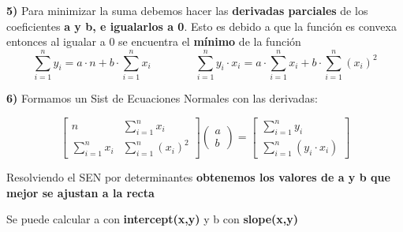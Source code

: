 \documentclass[12pt,a4paper]{article}
\begin{document}
\textbf{5)} Para minimizar la suma debemos hacer las \textbf{derivadas parciales} de los coeficientes \textbf{a y b, e igualarlos a 0}. Esto es debido a que la función es convexa entonces al igualar a 0 se encuentra el \textbf{mínimo} de la función
\[
\sum_{i=1}^{n} y_i = a\cdot n + b\cdot\sum_{i=1}^{n} x_i
\qquad\qquad
\sum_{i=1}^{n} y_i\cdot x_i = a\cdot\sum_{i=1}^{n} x_i + b\cdot\sum_{i=1}^{n} (x_i)^2
\]

\textbf{6)} Formamos un Sist de Ecuaciones Normales con las derivadas:

\begin{minipage}[t]{0.55\linewidth}
\vspace{0pt}
\[
\begin{bmatrix}
n & \displaystyle\sum_{i=1}^{n} x_i \\[10pt]
\displaystyle\sum_{i=1}^{n} x_i & \displaystyle\sum_{i=1}^{n} (x_i)^2
\end{bmatrix}
\begin{pmatrix} a \\ b \end{pmatrix}
=
\begin{bmatrix}
\displaystyle\sum_{i=1}^{n} y_i \\[10pt]
\displaystyle\sum_{i=1}^{n} \left(y_i\cdot x_i\right)
\end{bmatrix}
\]
\end{minipage}\hfill
\begin{minipage}[t]{0.43\linewidth}
\vspace{10pt}
Resolviendo el SEN por determinantes \textbf{obtenemos los valores de a y b que mejor se ajustan a la recta}

Se puede calcular a con \textbf{intercept(x,y)} y b con \textbf{slope(x,y)}
\end{minipage}
\end{document}

